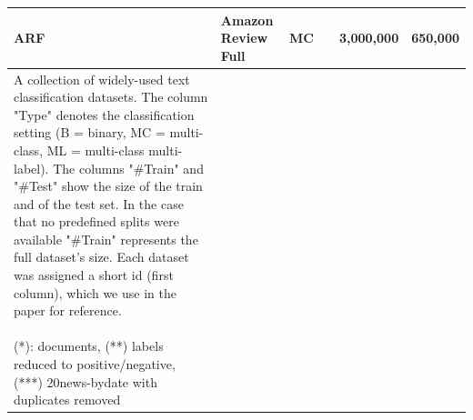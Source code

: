 {\begin{longtable}{l p{3.8cm} l p{4.1cm} r r}
  ARF & Amazon Review Full & MC &  & 3,000,000 & 650,000\\
  \hline
  \caption{A collection of widely-used text classification datasets.
  The column "Type" denotes the classification setting (B = binary, MC = multi-class, ML = multi-class multi-label). 
  The columns "\#Train" and "\#Test" show the size of the train and of the test set.
  In the case that no predefined splits were available "\#Train" represents the full dataset's size. 
  Each dataset was assigned a short id (first column), which we use in the paper for reference.\\
  \newline
  (*): documents, (**) labels reduced to positive/negative, (***) 20news-bydate with duplicates removed}
  \label{tab:datasets}
\end{longtable}
}
